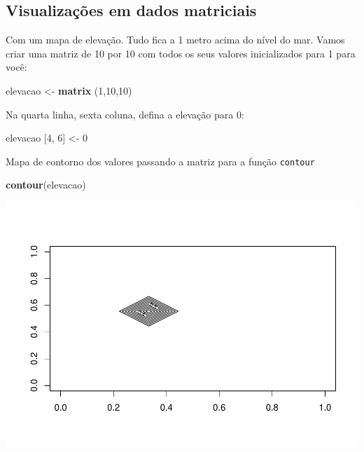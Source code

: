 \documentclass[]{book}
\newenvironment{Shaded}{\begin{snugshade}}{\end{snugshade}}
\newcommand{\DecValTok}[1]{\textcolor[rgb]{0.00,0.00,0.81}{#1}}
\newcommand{\KeywordTok}[1]{\textcolor[rgb]{0.13,0.29,0.53}{\textbf{#1}}}
\newcommand{\NormalTok}[1]{#1}
\newcommand{\StringTok}[1]{\textcolor[rgb]{0.31,0.60,0.02}{#1}}
\begin{document}
\hypertarget{visualizacoes-em-dados-matriciais}{%
\subsection{Visualizações em dados matriciais}\label{visualizacoes-em-dados-matriciais}}

Com um mapa de elevação. Tudo fica a 1 metro acima do nível do mar. Vamos criar uma matriz de 10 por 10 com todos os seus valores inicializados para 1 para você:

\begin{Shaded}
\begin{Highlighting}[]
\NormalTok{elevacao <-}\StringTok{ }\KeywordTok{matrix}\NormalTok{ (}\DecValTok{1}\NormalTok{,}\DecValTok{10}\NormalTok{,}\DecValTok{10}\NormalTok{)}
\end{Highlighting}
\end{Shaded}

Na quarta linha, sexta coluna, defina a elevação para 0:

\begin{Shaded}
\begin{Highlighting}[]
\NormalTok{elevacao [}\DecValTok{4}\NormalTok{, }\DecValTok{6}\NormalTok{] <-}\StringTok{ }\DecValTok{0}
\end{Highlighting}
\end{Shaded}

Mapa de contorno dos valores passando a matriz para a função \texttt{contour}

\begin{Shaded}
\begin{Highlighting}[]
\KeywordTok{contour}\NormalTok{(elevacao)}
\end{Highlighting}
\end{Shaded}

\includegraphics{TudodoR_files/figure-latex/unnamed-chunk-71-1.pdf}
\end{document}
